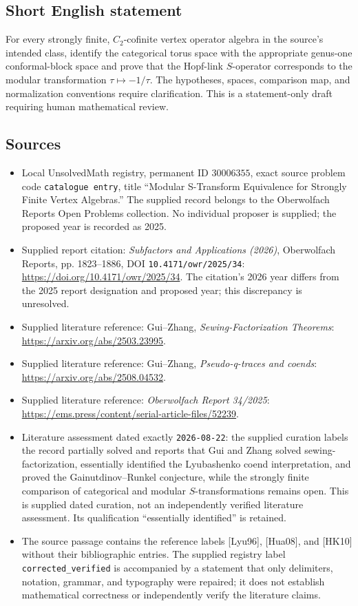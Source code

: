 \documentclass[11pt]{article}
\begin{document}
\subsection{Short English statement}
For every strongly finite, \(C_2\)-cofinite vertex operator algebra in the source's intended class, identify the categorical torus space with the appropriate genus-one conformal-block space and prove that the Hopf-link \(S\)-operator corresponds to the modular transformation \(\tau\mapsto-1/\tau\). The hypotheses, spaces, comparison map, and normalization conventions require clarification. This is a statement-only draft requiring human mathematical review.
\subsection{Sources}
\begin{itemize}
\item Local UnsolvedMath registry, permanent ID \(30006355\), exact source problem code \texttt{catalogue entry}, title ``Modular S-Transform Equivalence for Strongly Finite Vertex Algebras.'' The supplied record belongs to the Oberwolfach Reports Open Problems collection. No individual proposer is supplied; the proposed year is recorded as 2025.
\item Supplied report citation: \emph{Subfactors and Applications (2026)}, Oberwolfach Reports, pp. 1823--1886, DOI \texttt{10.4171/owr/2025/34}: \url{https://doi.org/10.4171/owr/2025/34}. The citation's 2026 year differs from the 2025 report designation and proposed year; this discrepancy is unresolved.
\item Supplied literature reference: Gui--Zhang, \emph{Sewing-Factorization Theorems}: \url{https://arxiv.org/abs/2503.23995}.
\item Supplied literature reference: Gui--Zhang, \emph{Pseudo-q-traces and coends}: \url{https://arxiv.org/abs/2508.04532}.
\item Supplied literature reference: \emph{Oberwolfach Report 34/2025}: \url{https://ems.press/content/serial-article-files/52239}.
\item Literature assessment dated exactly \texttt{2026-08-22}: the supplied curation labels the record partially solved and reports that Gui and Zhang solved sewing-factorization, essentially identified the Lyubashenko coend interpretation, and proved the Gainutdinov--Runkel conjecture, while the strongly finite comparison of categorical and modular \(S\)-transformations remains open. This is supplied dated curation, not an independently verified literature assessment. Its qualification ``essentially identified'' is retained.
\item The source passage contains the reference labels [Lyu96], [Hua08], and [HK10] without their bibliographic entries. The supplied registry label \texttt{corrected\_verified} is accompanied by a statement that only delimiters, notation, grammar, and typography were repaired; it does not establish mathematical correctness or independently verify the literature claims.
\end{itemize}
\end{document}

